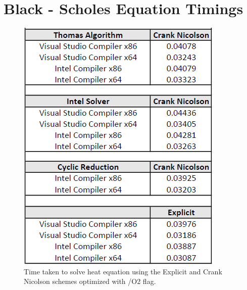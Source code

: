 \documentclass[12pt, oneside]{book}
\theoremstyle{plain}
\theoremstyle{definition}
\begin{document}
\chapter{Black - Scholes Equation Timings}\label{bsTime}

\begin{figure}[!htb]
  \begin{minipage}[b]{0.5\textwidth}
    \includegraphics[width=\textwidth]{bs2Optimized.png}
    \caption{Time taken to solve heat equation using the Explicit and Crank Nicolson schemes  optimized with /O2 flag.}
  \end{minipage}
  \begin{minipage}[b]{0.5\textwidth}

\end{minipage}
\end{figure}
\end{document}
